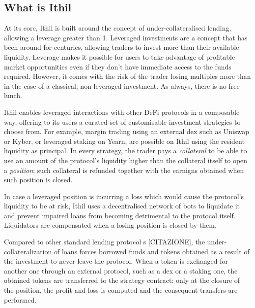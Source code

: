 \documentclass[a4paper,10 pt]{article}
\theoremstyle{definition}
\begin{document}
\subsection{What is Ithil}

At its core, Ithil is built around the concept of under-collateralised lending, allowing a leverage greater than 1.
Leveraged investments are a concept that has been around for centuries, allowing traders to invest more than their available liquidity. Leverage makes it possible for users to take advantage of profitable market opportunities even if they don't have immediate access to the funds required. However, it comes with the risk of the trader losing multiples more than in the case of a classical, non-leveraged investment. As always, there is no free lunch.

Ithil enables leveraged interactions with other DeFi protocols in a composable way, offering to its users a curated set of customisable investment strategies to choose from. For example, margin trading using an external dex such as Uniswap or Kyber, or leveraged staking on Yearn, are possible on Ithil using the resident liquidity as principal. In every strategy, the trader pays a {\it collateral} to be able to use an amount of the protocol's liquidity higher than the collateral itself to open a {\it position}; such collateral is refunded together with the earnigns obtained when such position is closed.

In case a leveraged position is incurring a loss which would cause the protocol's liquidity to be at risk, Ithil uses a decentralised network of bots to liquidate it and prevent impaired loans from becoming detrimental to the protocol itself. Liquidators are compensated when a losing position is closed by them.

Compared to other standard lending protocol s [CITAZIONE], the under-collateralization of loans forces borrowed funds and tokens obtained as a result of the investment to never leave the protocol. When a token is exchanged for another one through an external protocol, such as a dex or a staking one, the obtained tokens are transferred to the strategy contract: only at the closure of the position, the profit and loss is computed and the consequent transfers are performed.
\end{document}
